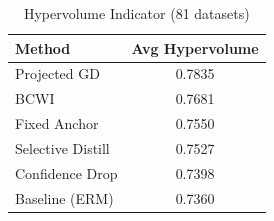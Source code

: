 \begin{table}[t]
\centering
\caption{Hypervolume Indicator (81 datasets)}
\label{tab:hypervolume}
\begin{tabular}{lc}
\toprule
Method & Avg Hypervolume \\
\midrule
Projected GD & 0.7835 \\
BCWI & 0.7681 \\
Fixed Anchor & 0.7550 \\
Selective Distill & 0.7527 \\
Confidence Drop & 0.7398 \\
Baseline (ERM) & 0.7360 \\
\bottomrule
\end{tabular}
\end{table}